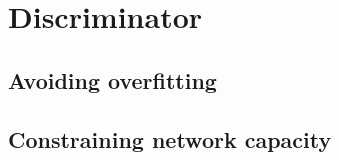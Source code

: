 \documentclass[../main.tex]{subfiles}
\begin{document}
\chapter{Discriminator}

\section{Avoiding overfitting}

\section{Constraining network capacity}
\end{document}
